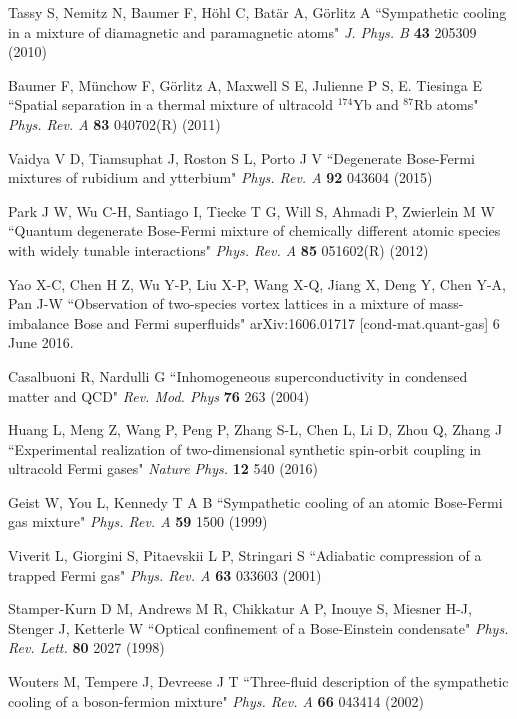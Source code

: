 \documentclass[pra,letterpaper,twocolumn,showpacs,superscriptaddress]{revtex4}
\begin{document}
\begin{thebibliography}{300}
 Tassy S, Nemitz N, Baumer F, H\"ohl C, Bat\"ar A, G\"orlitz A
``Sympathetic cooling in a mixture of diamagnetic and paramagnetic atoms" {\it J. Phys. B} \textbf{43} 205309 (2010)

Baumer F, M\"unchow F, G\"orlitz A, Maxwell S E, Julienne P S, E. Tiesinga E
``Spatial separation in a thermal mixture of ultracold ${}^{174}$Yb and ${}^{87}$Rb atoms" {\it Phys. Rev. A} \textbf{83} 040702(R) (2011)

 Vaidya V D, Tiamsuphat J, Roston S L, Porto  J V 
``Degenerate Bose-Fermi mixtures of rubidium and ytterbium" {\it Phys. Rev. A} \textbf{92} 043604 (2015)

 Park J W, Wu C-H, Santiago I, Tiecke T G, Will S, Ahmadi P, Zwierlein M W
``Quantum degenerate Bose-Fermi mixture of chemically different atomic species with widely tunable interactions"
{\it Phys. Rev. A} \textbf{85} 051602(R) (2012)

 Yao X-C, Chen H Z, Wu Y-P, Liu X-P, Wang X-Q, Jiang X, Deng Y, Chen Y-A, Pan J-W
``Observation of two-species vortex lattices in a mixture of mass-imbalance Bose and Fermi superfluids"
arXiv:1606.01717 [cond-mat.quant-gas] 6 June 2016.

 Casalbuoni R, Nardulli G ``Inhomogeneous superconductivity in condensed matter and QCD"
{\it Rev. Mod. Phys} {\bf 76} 263 (2004)

 Huang L, Meng Z, Wang P, Peng P, Zhang S-L, Chen L, Li D, Zhou Q, Zhang J
``Experimental realization of two-dimensional synthetic spin-orbit coupling in ultracold Fermi gases"
{\it Nature Phys.} \textbf{12} 540 (2016)

 Geist W, You L, Kennedy T A B
``Sympathetic cooling of an atomic Bose-Fermi gas mixture"
{\it Phys. Rev. A} \textbf{59} 1500 (1999)

 Viverit L, Giorgini S, Pitaevskii L P, Stringari S 
``Adiabatic compression of a trapped Fermi gas" {\it Phys. Rev. A} \textbf{63} 033603 (2001)

 Stamper-Kurn D M, Andrews M R, Chikkatur A P, Inouye S, Miesner H-J, Stenger J, Ketterle W 
``Optical confinement of a Bose-Einstein condensate"  {\it Phys. Rev. Lett.} \textbf{80} 2027 (1998)

 Wouters M, Tempere J, Devreese J T
``Three-fluid description of the sympathetic cooling of a boson-fermion mixture" {\it Phys. Rev. A} \textbf{66} 043414 (2002)


\end{thebibliography}
\end{document}
